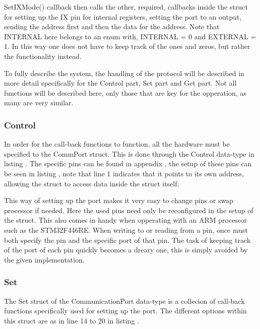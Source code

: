 SetIXMode() callback then calls the other, required, callbacks inside the struct for setting up the IX pin for internal registers, setting the port to an output, sending the address first and then the data for the address. Note that INTERNAL here belongs to an enum with, INTERNAL = 0 and EXTERNAL = 1. In this way one does not have to keep track of the ones and zeros, but rather the functionality instead.

To fully describe the system, the handling of the protocol will be described in more detail specifically for the Control part, Set part and Get part. Not all functions will be described here, only those that are key for the opperation, as many are very similar.

\subsubsection{Control}
In order for the call-back functions to function, all the hardware must be specified to the CommPort struct. This is done through the Control data-type in listing . The specific pins can be found in appendix , the setup of these pins can be seen in listing , note that line 1 indicates that it points to its own address, allowing the struct to access data inside the struct itself.



This way of setting up the port makes it very easy to change pins or swap processor if needed. Here the used pins need only be reconfigured in the setup of the struct. This also comes in handy when opperating with an ARM processor such as the STM32F446RE. When writing to or reading from a pin, once must both specify the pin and the specific port of that pin. The task of keeping track of the port of each pin quickly becomes a dreary one, this is simply avoided by the given implementation.

\subsubsection{Set}
The Set struct of the CommunicationPort data-type is a collecion of call-back functions specifically used for setting up the port. The different options within this struct are as in line 14 to 20 in listing .

